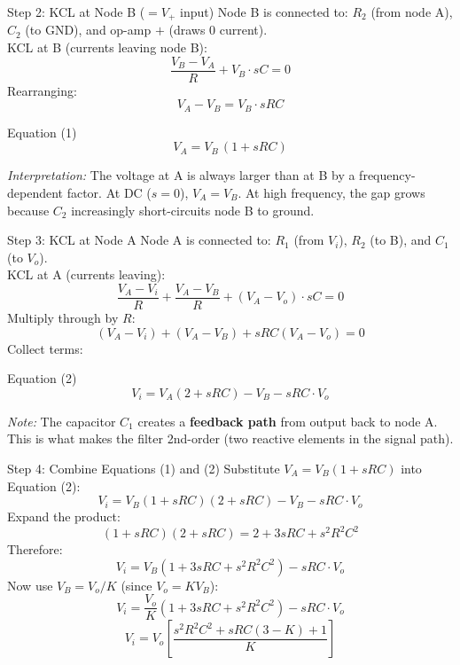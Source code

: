 \documentclass{beamer}
\begin{document}
\begin{frame}{Step 2: KCL at Node B ($= V_+$ input)}
  Node B is connected to: $R_2$ (from node A), $C_2$ (to GND), and op-amp $+$ (draws 0 current).\\[0.5em]
  KCL at B (currents leaving node B):
  \[
    \frac{V_B - V_A}{R} + V_B \cdot sC = 0
  \]
  Rearranging:
  \[
    V_A - V_B = V_B \cdot sRC
  \]
  \begin{alertblock}{Equation (1)}
    \[
      V_A = V_B\,(1 + sRC)
    \]
  \end{alertblock}
  \vspace{0.3em}
  \textit{Interpretation:} The voltage at A is always larger than at B by a
  frequency-dependent factor. At DC ($s=0$), $V_A = V_B$. At high frequency,
  the gap grows because $C_2$ increasingly short-circuits node B to ground.
\end{frame}

\begin{frame}{Step 3: KCL at Node A}
  Node A is connected to: $R_1$ (from $V_i$), $R_2$ (to B), and $C_1$ (to $V_o$).\\[0.5em]
  KCL at A (currents leaving):
  \[
    \frac{V_A - V_i}{R} + \frac{V_A - V_B}{R} + (V_A - V_o)\cdot sC = 0
  \]
  Multiply through by $R$:
  \[
    (V_A - V_i) + (V_A - V_B) + sRC(V_A - V_o) = 0
  \]
  Collect terms:
  \begin{alertblock}{Equation (2)}
    \[
      V_i = V_A(2 + sRC) - V_B - sRC\cdot V_o
    \]
  \end{alertblock}
  \vspace{0.3em}
  \textit{Note:} The capacitor $C_1$ creates a \textbf{feedback path} from output back to node A.
  This is what makes the filter 2nd-order (two reactive elements in the signal path).
\end{frame}

\begin{frame}{Step 4: Combine Equations (1) and (2)}
  Substitute $V_A = V_B(1+sRC)$ into Equation (2):
  \[
    V_i = V_B(1+sRC)(2+sRC) - V_B - sRC\cdot V_o
  \]
  Expand the product:
  \[
    (1+sRC)(2+sRC) = 2 + 3sRC + s^2R^2C^2
  \]
  Therefore:
  \[
    V_i = V_B\!\left(1 + 3sRC + s^2R^2C^2\right) - sRC\cdot V_o
  \]
  Now use $V_B = V_o/K$ (since $V_o = KV_B$):
  \[
    V_i = \frac{V_o}{K}\!\left(1 + 3sRC + s^2R^2C^2\right) - sRC\cdot V_o
  \]
  \[
    V_i = V_o\!\left[\frac{s^2R^2C^2 + sRC(3-K) + 1}{K}\right]
  \]
\end{frame}
\end{document}
